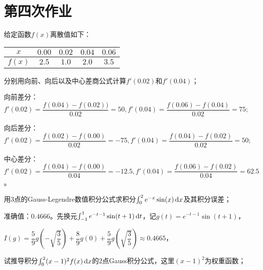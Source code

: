 \chapter{第四次作业}

    \begin{homework}[6pts]
        给定函数$f(x)$离散值如下：
            \begin{table}[H]
                \begin{center}
                    \begin{tabular}{|c|c|c|c|c|}
                    \hline
                    $x$ & $0.00$ & $0.02$ & $0.04$ & $0.06$ \\
                    \hline
                    $f(x)$ & $2.5$ & $1.0$ & $2.0$ & $3.5$ \\
                    \hline
                    \end{tabular}
                \end{center}
            \end{table}
            分别用向前、向后以及中心差商公式计算$f'(0.02)$和$f'(0.04)$；
    \end{homework}

    \begin{solution}
        向前差分：$f'(0.02)=\dfrac{f(0.04)-f(0.02))}{0.02}=50,f'(0.04)=\dfrac{f(0.06)-f(0.04)}{0.02}=75;$

        向后差分：$f'(0.02)=\dfrac{f(0.02)-f(0.00)}{0.02}=-75,f'(0.04)=\dfrac{f(0.04)-f(0.02)}{0.02}=50;$

        中心差分：$f'(0.02)=\dfrac{f(0.04)-f(0.00)}{0.04}=-12.5,f'(0.04)=\dfrac{f(0.06)-f(0.02)}{0.04}=62.5$。
    \end{solution}

    \begin{homework}[8pts]
        用$3$点的Gauss-Legendre数值积分公式求积分$\int_0^2 e^{-x}\sin(x)\mathop{}\!\mathrm{d} x$及其积分误差；
    \end{homework}

    \begin{solution}
        准确值：$0.4666$。先换元$\int_{-1}^1 e^{-t-1}\sin(t+1)\mathop{}\!\mathrm{d} t$，记$g(t)=e^{-t-1}\sin(t+1)$，

        $I(g)=\dfrac59 g\left(-\sqrt{\dfrac35}\right)+\dfrac89 g(0)+\dfrac59 g\left(\sqrt{\dfrac35}\right)\approx0.4665$，
    \end{solution}

    \begin{homework}[8pts]
        试推导积分$\int_0^2 (x-1)^2 f(x)\mathop{}\!\mathrm{d} x$的$2$点Gauss积分公式，这里$(x-1)^2$为权重函数；
    \end{homework}

